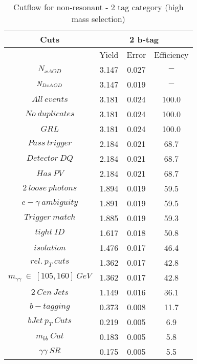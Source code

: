 \begin{table}\footnotesize
\begin{center}
\caption{Cutflow for non-resonant \hhyybb - 2 tag category (high mass selection)}
\label{tab:cutflow-nonres-2tag-high}
\begin{tabular}{|c|c|c|c|}
 \hline
Cuts& \multicolumn{3}{c|}{2 b-tag} \\ \hline
 &Yield&Error&Efficiency\\ \hline
$N_{xAOD}$ & 3.147&0.027 &$-$ \\
 \hline
$\it{N}_{DxAOD}$ & 3.147&0.019 &$-$ \\
 \hline
$All\ events$ & 3.181&0.024 &100.0 \\
 \hline
$No\ duplicates$ & 3.181&0.024 &100.0 \\
 \hline
$GRL$ & 3.181&0.024 &100.0 \\
 \hline
$Pass\ trigger$ & 2.184&0.021 &68.7 \\
 \hline
$Detector\ DQ$ & 2.184&0.021 &68.7 \\
 \hline
$Has\ PV$ & 2.184&0.021 &68.7 \\
 \hline
$2\ loose\ photons$ & 1.894&0.019 &59.5 \\
 \hline
$e-\gamma\ ambiguity$ & 1.891&0.019 &59.5 \\
 \hline
$Trigger\ match$ & 1.885&0.019 &59.3 \\
 \hline
$tight\ ID$ & 1.617&0.018 &50.8 \\
 \hline
$isolation$ & 1.476&0.017 &46.4 \\
 \hline
$rel.\ p_{T}\ cuts$ & 1.362&0.017 &42.8 \\
 \hline
$m_{\gamma\gamma}\ \in\ [105,160]\ GeV$ & 1.362&0.017 &42.8 \\
 \hline
$2\ Cen\ Jets$ & 1.149&0.016 &36.1 \\
 \hline
$b-tagging$ & 0.373&0.008 &11.7 \\
 \hline
$bJet\ p_{T}\ Cuts$ & 0.219&0.005 & 6.9 \\
 \hline
$m_{bb}\ Cut$ & 0.183&0.005 & 5.8 \\
 \hline
$\gamma\gamma\ SR$ & 0.175&0.005 & 5.5 \\
 \hline
\end{tabular}
\end{center}
\end{table}
